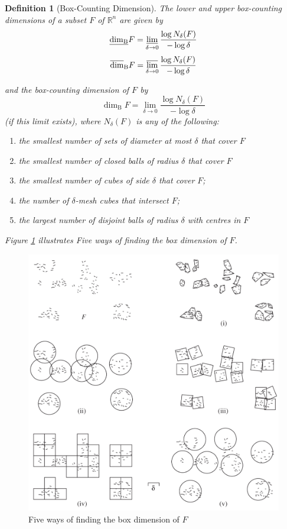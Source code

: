 \documentclass[12pt, a4paper]{article}
\newtheorem{definition}{Definition}[subsection]
\begin{document}
\begin{definition}[Box-Counting Dimension]\label{bcd-def}
    The lower and upper box-counting dimensions of a subset $F$ of $\mathbb{R}^{n}$ are given by
    $$\underline{\operatorname{dim}_{\mathrm{B}}} F=\varliminf_{\delta \rightarrow 0} \frac{\log N_{\delta}(F)}{-\log \delta}$$
    $$\overline{\operatorname{dim}}_{\mathrm{B}} F=\varlimsup_{\delta \rightarrow 0} \frac{\log N_{\delta}(F)}{-\log \delta}$$
    
and the box-counting dimension of $F$ by
$$
\operatorname{dim}_{\mathrm{B}} F=\lim _{\delta \rightarrow 0} \frac{\log N_{\delta}(F)}{-\log \delta}
$$
(if this limit exists), where $N_{\delta}(F)$ is any of the following:
\begin{enumerate}[i]
    \item the smallest number of sets of diameter at most $\delta$ that cover $F$
    \item  the smallest number of closed balls of radius $\delta$ that cover $F$
    \item  the smallest number of cubes of side $\delta$ that cover $F$;
    \item  the number of $\delta$-mesh cubes that intersect $F$;
    \item  the largest number of disjoint balls of radius $\delta$ with centres in $F$  
\end{enumerate}  
Figure \ref{fig:bcd-def-vis} illustrates Five ways of finding the box dimension of $F$.

\end{definition}


\begin{figure}[t]
    \centering
    \includegraphics[width=.66\textwidth]{images/bcd-def-vis.png}
    \caption{Five ways of finding the box dimension of $F$}
    \label{fig:bcd-def-vis}
\end{figure}
\end{document}
